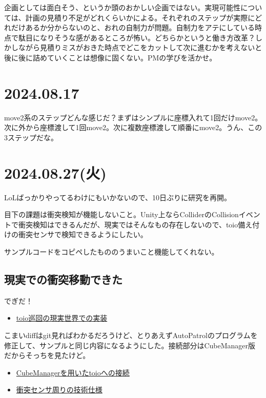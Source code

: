 \documentclass[fleqn,twocolumn]{mynote}
\begin{document}
  企画としては面白そう、というか頭のおかしい企画ではない。実現可能性については、計画の見積り不足がどれくらいかによる。それぞれのステップが実際にどれだけあるか分からないのと、おれの自制力が問題。自制力をアテにしている時点で駄目になりそうな感があるところが怖い。どちらかというと働き方改革？しかしながら見積りミスがおきた時点でどこをカットして次に進むかを考えないと後に後に詰めていくことは想像に固くない。PMの学びを活かせ。

  \section*{2024.08.17}
  move2系のステップどんな感じだ？まずはシンプルに座標入れて1回だけmove2。次に外から座標渡して1回move2。次に複数座標渡して順番にmove2。うん、この3ステップだな。

  \section*{2024.08.27(火)}
  LoLばっかりやってるわけにもいかないので、10日ぶりに研究を再開。

  目下の課題は衝突検知が機能しないこと。Unity上ならColliderのCollisionイベントで衝突検知はできるんだが、現実ではそんなもの存在しないので、toio備え付けの衝突センサで検知できるようにしたい。

  サンプルコードをコピペしたもののうまいこと機能してくれない。

  \subsection*{現実での衝突移動できた}
  でぎだ！

  \begin{itemize}
    \item \href{https://www.youtube.com/watch?v=-0CJAu6-GsE}{toio巡回の現実世界での実装}
  \end{itemize}

  こまいdiffはgit見ればわかるだろうけど、とりあえずAutoPatrolのプログラムを修正して、サンプルと同じ内容になるようにした。接続部分はCubeManager版だからそっちを見たけど。

  \begin{itemize}
    \item
      \href{https://morikatron.github.io/toio-sdk-for-unity/docs/tutorials_basic.html#9-cubemanager\%E3\%82\%AF\%E3\%83\%A9\%E3\%82\%B9\%E3\%82\%92\%E7\%94\%A8\%E3\%81\%84\%E3\%81\%9F\%E3\%82\%BD\%E3\%83\%BC\%E3\%82\%B9\%E3\%82\%B3\%E3\%83\%BC\%E3\%83\%89\%E3\%81\%AE\%E7\%B0\%A1\%E7\%95\%A5\%E5\%8C\%96}{CubeManagerを用いたtoioへの接続}
    \item \href{https://toio.github.io/toio-spec/docs/ble_sensor/}{衝突センサ周りの技術仕様}
  \end{itemize}
\end{document}
